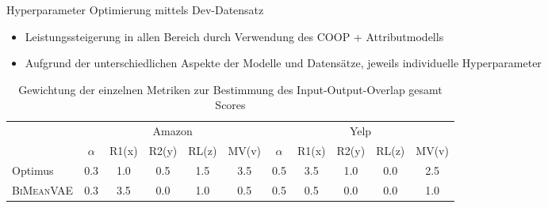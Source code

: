 \begin{frame}{Hyperparameter Optimierung mittels Dev-Datensatz}

  \begin{itemize}
    \item Leistungssteigerung in allen Bereich durch Verwendung des COOP + Attributmodells
    \item Aufgrund der unterschiedlichen Aspekte der Modelle und Datensätze, jeweils individuelle Hyperparameter
  \end{itemize}
  
  \begin{table}[h!]
    \centering
    \begin{tabular}{@{}lccccc|ccccc@{}}
    \toprule
    & \multicolumn{5}{c}{Amazon} & \multicolumn{5}{c}{Yelp} \\ 
    
             &$\alpha$ & R1(x)  & R2(y)  & RL(z) & MV(v)&$\alpha$ &  R1(x)  & R2(y)  & RL(z) & MV(v) \\ \midrule

    Optimus            & 0.3 & 1.0 & 0.5 & 1.5 & 3.5 & 0.5 & 3.5 & 1.0 & 0.0 & 2.5 \\
    \textsc{BiMeanVAE} & 0.3 & 3.5 & 0.0 & 1.0 & 0.5 & 0.5 & 0.5 & 0.0 & 0.0 & 1.0 \\ \bottomrule
    \end{tabular}
    \caption{Gewichtung der einzelnen Metriken zur Bestimmung des Input-Output-Overlap gesamt Scores}

\end{table}
  
\end{frame}